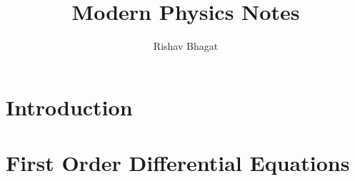 \title{Modern Physics Notes}

\author{Rishav Bhagat}

\maketitle
\chapter{Introduction}
    
    
    
    \graphicspath{{../chapter_1/section_1.4/}}
    
\chapter{First Order Differential Equations}